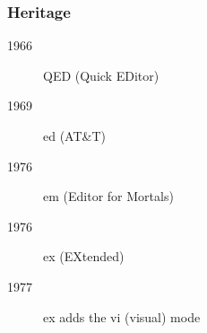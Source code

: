 \begin{frame}[fragile]
  \frametitle{Heritage}
  \begin{description}
    \item[1966] QED (Quick EDitor)
    \item[1969] ed (AT\&T)
    \item[1976] em (Editor for Mortals)
    \item[1976] ex (EXtended)
    \item[1977] ex adds the vi (visual) mode
  \end{description}
\end{frame}
